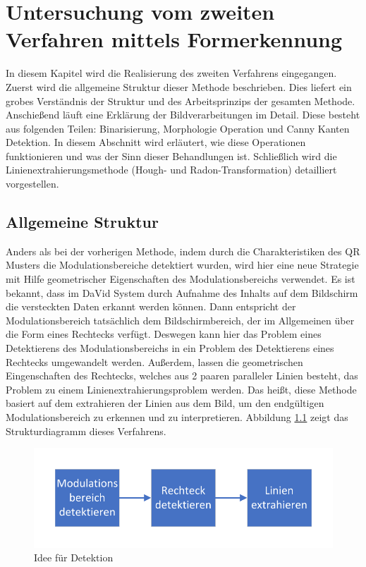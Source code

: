 \chapter{Untersuchung vom zweiten Verfahren mittels Formerkennung} 

In diesem Kapitel wird die Realisierung des zweiten Verfahrens eingegangen. Zuerst wird die allgemeine Struktur dieser Methode beschrieben. Dies liefert ein grobes Verständnis der Struktur und des Arbeitsprinzips der gesamten Methode. Anschießend läuft eine Erklärung der Bildverarbeitungen im Detail. Diese besteht aus folgenden Teilen: Binarisierung, Morphologie Operation und Canny Kanten Detektion. In diesem Abschnitt wird erläutert, wie diese Operationen funktionieren und was der Sinn dieser Behandlungen ist. Schließlich wird die Linienextrahierungsmethode (Hough- und Radon-Transformation) detailliert vorgestellen. 

\section{Allgemeine Struktur} 

Anders als bei der vorherigen Methode, indem durch die  Charakteristiken des QR Musters die Modulationsbereiche detektiert wurden, wird hier eine neue Strategie mit Hilfe geometrischer Eigenschaften des Modulationsbereichs verwendet. Es ist bekannt, dass im DaVid System durch Aufnahme des Inhalts auf dem Bildschirm die versteckten Daten erkannt werden können. Dann entspricht der Modulationsbereich tatsächlich dem Bildschirmbereich, der im Allgemeinen über die Form eines Rechtecks verfügt. Deswegen kann hier das Problem eines Detektierens des Modulationsbereichs in ein Problem des Detektierens eines Rechtecks umgewandelt werden. Außerdem, lassen die geometrischen Eingenschaften des Rechtecks, welches aus 2 paaren paralleler Linien besteht, das Problem zu einem Linienextrahierungsproblem werden. Das heißt, diese Methode basiert auf dem extrahieren der Linien aus dem Bild, um den endgültigen Modulationsbereich zu erkennen und zu interpretieren. Abbildung \ref{fig:Strukturdiagramm für zweite Methode} zeigt das Strukturdiagramm dieses Verfahrens.

\begin{figure}[H]
 \centering 
 \includegraphics[keepaspectratio,width=1.0\textwidth]{images/4_ZweiteErfahrung/Strukturdiagramm.pdf}
 \caption{Idee für Detektion}
 \label{fig:Strukturdiagramm für zweite Methode}
\end{figure}



